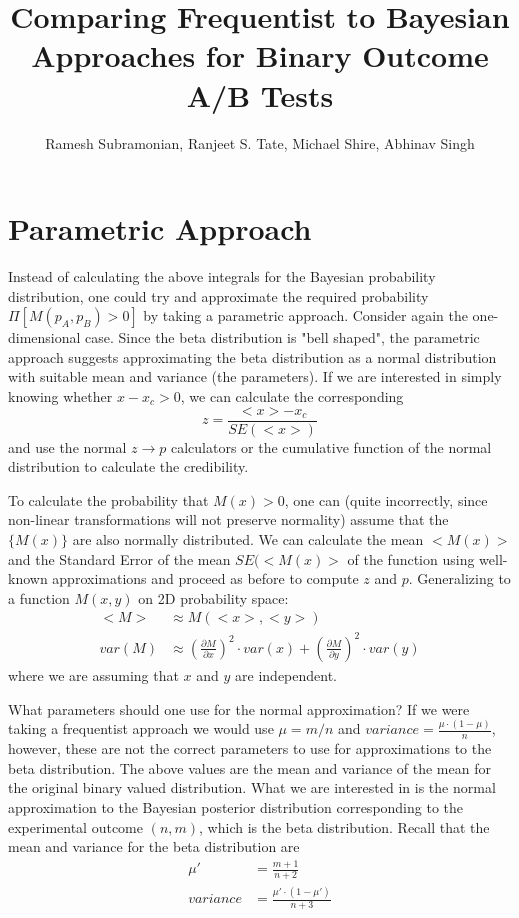 \documentclass[letterpaper,12pt]{article}
\newcommand{\beq}{\begin{equation}} %
\newcommand{\eeq}{\end{equation}} %
\newcommand{\bdm}{\begin{displaymath}} %
\newcommand{\edm}{\end{displaymath}} %
\begin{document}
\title{Comparing Frequentist to Bayesian Approaches for Binary Outcome A/B Tests}
\author{Ramesh Subramonian, Ranjeet S. Tate, Michael Shire, Abhinav Singh}
\maketitle
\thispagestyle{fancy}
\lhead{}
\chead{}
\rhead{}
\lfoot{}

\section{Parametric Approach}

Instead of calculating the above integrals for the Bayesian
probability distribution, one could try and approximate the required
probability \(\Pi[M(p_A, p_B)>0]\) by taking a parametric
approach. Consider again the one-dimensional case. Since the beta
distribution is "bell shaped", the parametric approach suggests
approximating the beta distribution as a normal distribution with
suitable mean and variance (the parameters). If we are interested in
simply knowing whether \(x-x_c>0\), we can calculate the corresponding
\bdm
z = \frac{<x>-x_c}{SE(<x>)}
\edm
and use the normal \(z\rightarrow p\) calculators or
the cumulative function of
the normal distribution to calculate the credibility.

To calculate the probability that \(M(x)>0\), one can
(quite incorrectly, since non-linear transformations will not preserve
normality) assume that the \(\{M(x)\}\) are also normally
distributed. We can calculate the mean \(<M(x)>\) and the
Standard Error of the mean \(SE(<M(x)>\) of the function using
well-known approximations and proceed as before to compute \(z\) and
\(p\). Generalizing to a function \(M(x,y)\) on 2D probability space:
\beq
\begin{split}
  <M> &\approx M(<x>,<y>)\\
  var(M) &\approx \left(\frac{\partial M}{\partial x}\right)^2\cdot var(x)
  + \left(\frac{\partial M}{\partial y}\right)^2\cdot var(y)
\end{split}
\eeq
where we are assuming that \(x\) and \(y\) are independent.

What parameters should one use for the normal approximation? If we were
taking a frequentist approach we would use \(\mu =m/n\)
and \(variance = \frac{\mu\cdot(1-\mu)}{n}\), however, these are
not the correct parameters to use for approximations to the beta
distribution. The above values are the mean and variance of the mean
for the original
binary valued distribution. What we are interested in is the normal
approximation to the Bayesian posterior distribution corresponding to the
experimental outcome \( (n,m) \), which is the beta distribution. Recall that
the mean and variance for the beta distribution are
\beq
\begin{split}
  \mu' &= \frac{m+1}{n+2}\\
  variance &= \frac{\mu'\cdot (1-\mu')}{n+3}
\end{split}
\eeq
\end{document}
